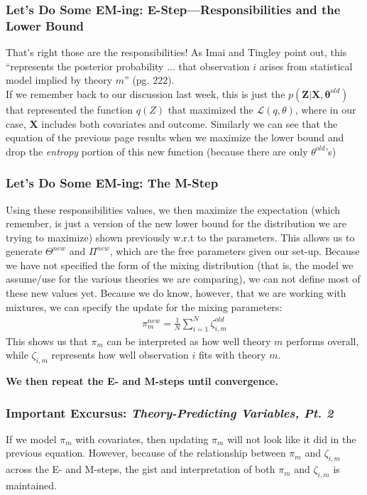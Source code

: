 \documentclass{beamer}
\begin{document}
               
\begin{frame}
\frametitle{Let's Do Some EM-ing: E-Step---Responsibilities and the Lower Bound}
That's right those are the responsibilities! As Imai and Tingley point out, this ``represents the posterior probability ... that observation $i$ arises from statistical model implied by theory $m$'' (pg. 222).\\

\bigskip
If we remember back to our discussion last week, this is just the $p(\mathbf{Z}|\mathbf{X}, \boldsymbol{\theta}^{old})$ that represented the function $q(Z)$ that maximized the $\mathcal{L}(q, \theta)$, where in our case, $\mathbf{X}$ includes both covariates and outcome. Similarly we can see that the equation of the previous page results when we maximize the lower bound and drop the \textit{entropy} portion of this new function (because there are only $\theta^{old}$'s)

\end{frame}

\begin{frame}
\frametitle{Let's Do Some EM-ing: The M-Step}
Using these responsibilities values, we then maximize the expectation (which remember, is just a version of the new lower bound for the distribution we are trying to maximize) shown previously w.r.t to the parameters. This allows us to generate $\Theta^{new}$ and $\Pi^{new}$, which are the free parameters given our set-up. Because we have not specified the form of the mixing distribution (that is, the model we assume/use for the various theories we are comparing), we can not define most of these new values yet. Because we do know, however, that we are working with mixtures, we can specify the update for the mixing parameters:
\begin{align}
	\pi_m^{new} = \frac{1}{N}\sum_{i=1}^{N}\zeta_{i,m}^{old}
\end{align}
This shows us that $\pi_m$ can be interpreted as how well theory $m$ performs overall, while $\zeta_{i,m}$ represents how well observation $i$ fits with theory $m$.

\bigskip
\textbf{We then repeat the E- and M-steps until convergence.}
\end{frame}

\begin{frame}
\frametitle{Important Excursus: \textit{Theory-Predicting Variables, Pt. 2}}
If we model $\pi_m$ with covariates, then updating $\pi_m$ will not look like it did in the previous equation. However, because of the relationship between $\pi_m$ and $\zeta_{i,m}$ across the E- and M-steps, the gist and interpretation of both  $\pi_m$ and $\zeta_{i,m}$ is maintained.

\end{frame}
\end{document}
